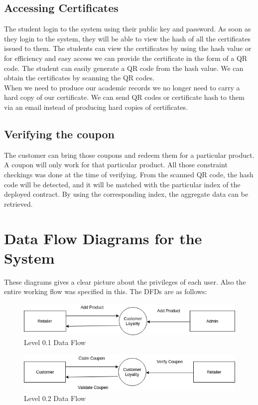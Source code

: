 \subsection{Accessing Certificates}
The student login to the system using their public key and password. As soon as they login to the system, they will be able to view the hash of all the certificates issued to them. The students can view the certificates by using the hash value or for efficiency and easy access we can provide the certificate in the form of a QR code. The student can easily generate a QR code from the hash value. We can obtain the certificates by scanning the QR codes. \\
When we need to produce our academic records we no longer need to carry a hard copy of our certificate. We can send QR codes or certificate hash to them via an email instead of producing hard copies of certificates.
\subsection{Verifying the coupon}
The customer can bring those coupons and redeem them for a particular product. A coupon will only work for that particular product. All those constraint checkings was done at the time of verifying. From the scanned QR code, the hash code will be detected, and it will be matched with the particular index of the deployed contract. By using the corresponding index, the aggregate data can be retrieved.


\section{Data Flow Diagrams for the System}
\par
These diagrams gives a clear picture about the privileges of each user. Also the entire working flow was specified in this. The DFDs are as follows:
\begin{figure}[H]
\includegraphics[scale=0.7]{level0_1}
\caption{Level 0.1 Data Flow}
\end{figure}

\begin{figure}[H]
\includegraphics[scale=0.7]{level0_2}
\caption{Level 0.2 Data Flow}
\end{figure}


